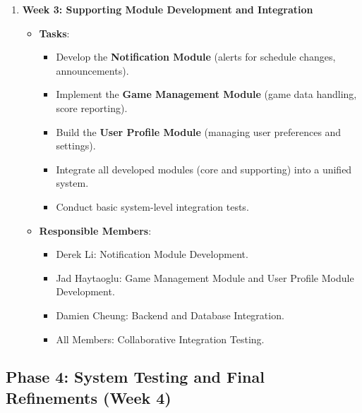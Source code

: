 \documentclass[12pt, titlepage]{article}
\begin{document}
\begin{enumerate}
    \item \textbf{Week 3: Supporting Module Development and Integration}
    \begin{itemize}
        \item \textbf{Tasks}:
        \begin{itemize}
            \item Develop the \textbf{Notification Module} (alerts for schedule changes, announcements).
            \item Implement the \textbf{Game Management Module} (game data handling, score reporting).
            \item Build the \textbf{User Profile Module} (managing user preferences and settings).
            \item Integrate all developed modules (core and supporting) into a unified system.
            \item Conduct basic system-level integration tests.
        \end{itemize}
        \item \textbf{Responsible Members}:
        \begin{itemize}
            \item Derek Li: Notification Module Development.
            \item Jad Haytaoglu: Game Management Module and User Profile Module Development.
            \item Damien Cheung: Backend and Database Integration.
            \item All Members: Collaborative Integration Testing.
        \end{itemize}
    \end{itemize}
\end{enumerate}

\subsection*{Phase 4: System Testing and Final Refinements (Week 4)}
\end{document}
